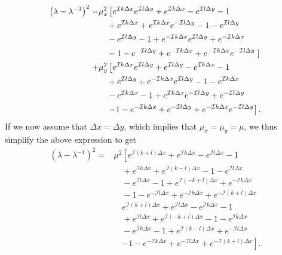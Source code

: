 \begin{equation*}
    \begin{split}
    \left(\lambda - \lambda^{-1}\right)^2 = &\mu_x^2\left[  e^{\mathcal{I}k \Delta x}e^{\mathcal{I}l \Delta y}+e^{\mathcal{I}k \Delta x}-e^{\mathcal{I}l \Delta y}-1 \right. \\
    &\quad+e^{\mathcal{I}k \Delta x}+ e^{\mathcal{I}k \Delta x}e^{-\mathcal{I}l \Delta y}-1-e^{\mathcal{I}l \Delta y} \\
     &\quad-e^{\mathcal{I}l \Delta y}-1+e^{-\mathcal{I}k \Delta x}e^{\mathcal{I}l \Delta y}+e^{-\mathcal{I}k \Delta x} \\ 
     &\quad-1-e^{-\mathcal{I}l \Delta y}+e^{-\mathcal{I}k \Delta x}+e^{-\mathcal{I}k \Delta x}e^{-\mathcal{I}l \Delta y} 
    \left.\right] \\
    \vspace{1cm}
    +&\mu_y^2\left[ e^{\mathcal{I}k \Delta x}e^{\mathcal{I}l \Delta y}+e^{\mathcal{I}l \Delta y}-e^{\mathcal{I}k \Delta x}-1  \right.\\
    &\quad+e^{\mathcal{I}l \Delta y}+ e^{-\mathcal{I}k \Delta x}e^{\mathcal{I}l \Delta y}-1-e^{\mathcal{I}k \Delta x} \\
    &\quad-e^{\mathcal{I}k \Delta x}-1+e^{\mathcal{I}k \Delta x}e^{-\mathcal{I}l \Delta y}+e^{-\mathcal{I}l \Delta y} \\ 
    &\quad\left.-1-e^{-\mathcal{I}k \Delta x}+e^{-\mathcal{I}l \Delta y}+e^{-\mathcal{I}k \Delta x}e^{-\mathcal{I}l \Delta y} \right]. 
    \end{split}
\end{equation*}
If we now assume that $\Delta x = \Delta y$, which implies that $\mu_x = \mu_y = \mu$, we thus simplify the above expression to get
\begin{equation*}
    \begin{split}
    \left(\lambda - \lambda^{-1}\right)^2 = &\mu^2\left[  e^{\mathcal{I}(k+l) \Delta x}+e^{\mathcal{I}k \Delta x}-e^{\mathcal{I}l \Delta x}-1 \right. \\
    &\quad+e^{\mathcal{I}k \Delta x}+ e^{\mathcal{I}(k-l) \Delta x}-1-e^{\mathcal{I}l \Delta x} \\
     &\quad-e^{\mathcal{I}l \Delta x}-1+e^{\mathcal{I}(-k+l) \Delta x}+e^{-\mathcal{I}k \Delta x} \\ 
     &\quad-1-e^{-\mathcal{I}l \Delta x}+e^{-\mathcal{I}k \Delta x}+e^{-\mathcal{I}(k+l) \Delta x} \\
     &\quad e^{\mathcal{I}(k+l) \Delta x}+e^{\mathcal{I}l \Delta x}-e^{\mathcal{I}k \Delta x}-1  \\
     &\quad+e^{\mathcal{I}l \Delta x}+ e^{\mathcal{I}(-k+l) \Delta x}-1-e^{\mathcal{I}k \Delta x} \\
     &\quad-e^{\mathcal{I}k \Delta x}-1+e^{\mathcal{I}(k-l) \Delta x}+e^{-\mathcal{I}l \Delta x} \\ 
     &\quad\left.-1-e^{-\mathcal{I}k \Delta x}+e^{-\mathcal{I}l \Delta x}+e^{-\mathcal{I}(k+l) \Delta x} \right]. 
    \end{split}
\end{equation*}
